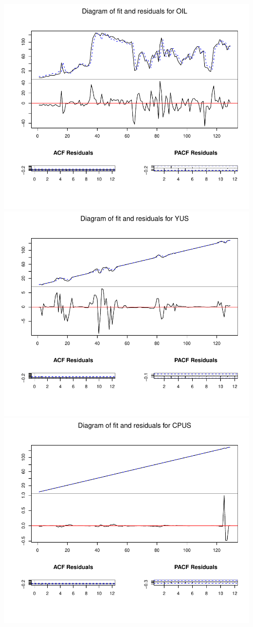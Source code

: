 \documentclass[11pt,preprint, authoryear]{elsarticle}
\numberwithin{equation}{section}
\numberwithin{figure}{section}
\numberwithin{table}{section}
\begin{document}
\includegraphics{replication_files/figure-latex/unnamed-chunk-4-1.pdf}
\includegraphics{replication_files/figure-latex/unnamed-chunk-4-2.pdf}
\includegraphics{replication_files/figure-latex/unnamed-chunk-4-3.pdf}
\end{document}

